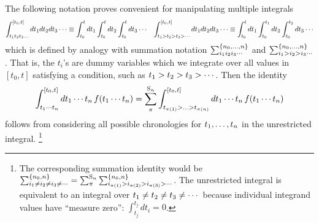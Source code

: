\documentclass[11pt]{article}
\numberwithin{equation}{section}
\begin{document}
\begin{ntt}
The following notation proves convenient for manipulating multiple integrals
\begin{align}
  \int_{t_1t_2t_3\ldots}^{[t_0,t]}
  dt_1dt_2dt_3\cdots
\equiv
  \int_{t_0}^t
  dt_1
  \int_{t_0}^t
  dt_2
  \int_{t_0}^t
  dt_3
  \cdots
&&
  \int_{t_1>t_2>t_3>\cdots}^{[t_0,t]}
  dt_1dt_2dt_3\cdots
\equiv
  \int_{t_0}^t
  dt_1
  \int_{t_0}^{t_1}
  dt_2
  \int_{t_0}^{t_2}
  dt_3
  \cdots
\end{align}
which is defined by analogy with summation notation
$
  \sum_{i_1i_2i_3\cdots}^{\{n_0,\ldots,n\}}
$
and
$
  \sum_{i_1>i_2>i_3\cdots}^{\{n_0,\ldots,n\}}
$.
That is, the $t_i$'s are dummy variables which we integrate over all values in $[t_0,t]$ satisfying a condition, such as $t_1>t_2>t_3>\cdots$.
Then the identity
\begin{align}
\label{eq:integral-identity}
  \int_{t_1\cd t_n}^{[t_0,t]}
  dt_1\cd t_n\,
  f(t_1\cd t_n)
=
  \sum_\pi^{\mr{S}_n}
  \int_{t_{\pi(1)}>\ld>t_{\pi(n)}}^{[t_0,t]}
  dt_1\cd t_n\,
  f(t_1\cd t_n)
\end{align}
follows from considering all possible chronologies for $t_1,\ldots,t_n$ in the unrestricted integral.\footnotemark
\footnote{
  The corresponding summation identity would be
$
  \sum_{i_1\neq i_2\neq i_3\neq\cd}^{\{n_0,n\}}
=
  \sum_{\pi}^{\mr{S}_n}
  \sum_{i_{\pi(1)}> i_{\pi(2)}> i_{\pi(3)}>\cd}^{\{n_0,n\}}
$.
  The unrestricted integral is equivalent to an integral over $t_1\neq t_2\neq t_3\neq\cdots$ because individual integrand values have ``measure zero'':
$
  \int_{t_j}^{t_j}
  dt_i
=
  0
$.
}
\end{ntt}


\begin{prop}
\end{prop}
\end{document}
